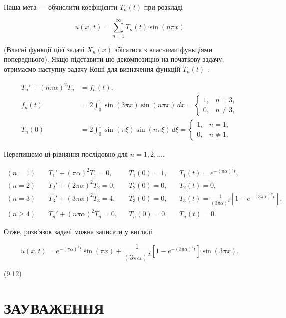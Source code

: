 \documentclass[
  ukrainian,
]{article}
\begin{document}
Наша мета --- обчислити коефіцієнти \(T_n(t)\) при розкладі

\[
u\left(x,\,t\right)=\sum_{n=1}^{\infty}T_n(t)\sin(n\pi x)
\]

(Власні функції цієї задачі \(X_n(x)\) збігатися з власними функціями
попереднього). Якщо підставити цю декомпозицію на початкову задачу,
отримаємо наступну задачу Коші для визначення функцій \(T_n(t)\) :

\[
\begin{aligned}
T_n' + (n\pi\alpha)^2 T_n &= f_n(t), \\
f_n(t) &= 2 \int_0^1 \sin(3\pi x)\sin(n\pi x)\,dx
= \begin{cases}
1, & n = 3, \\
0, & n \ne 3,
\end{cases} \\
T_n(0) &= 2 \int_0^1 \sin(\pi \xi)\sin(n\pi \xi)\,d\xi
= \begin{cases}
1, & n = 1, \\
0, & n \ne 1.
\end{cases}
\end{aligned}
\]

Перепишемо ці рівняння послідовно для \(n=1,2,\dots\).

\[
\begin{aligned}
(n=1)\quad & T_1' + (\pi\alpha)^2 T_1 = 0, && T_1(0) = 1, && T_1(t) = e^{-(\pi\alpha)^2 t}, \\
(n=2)\quad & T_2' + (2\pi\alpha)^2 T_2 = 0, && T_2(0) = 0, && T_2(t) = 0, \\
(n=3)\quad & T_3' + (3\pi\alpha)^2 T_3 = 4, && T_3(0) = 0, && T_3(t) = \frac{1}{(3\pi\alpha)^2}\left[1 - e^{-(3\pi\alpha)^2 t}\right], \\
(n\geqslant 4)\quad & T_n' + (n\pi\alpha)^2 T_n = 0, && T_n(0) = 0, && T_n(t) = 0.
\end{aligned}
\]

Отже, розв'язок задачі можна записати у вигляді

\[u(x, t) = e^{-(\pi\alpha)^2 t} \sin(\pi x) + \frac{1}{(3\pi\alpha)^2} [1 - e^{-(3\pi\alpha)^2 t}] \sin(3\pi x).\]

(9.12)

\section{ЗАУВАЖЕННЯ}\label{ux437ux430ux443ux432ux430ux436ux435ux43dux43dux44f-6}
\end{document}
